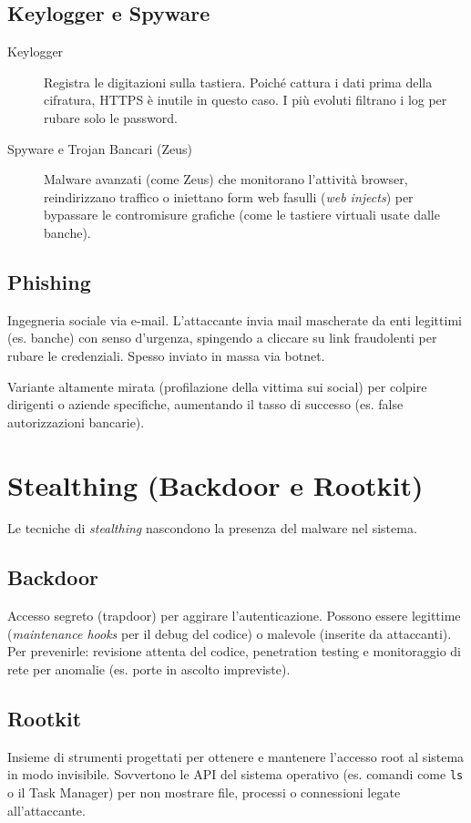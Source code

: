\subsection{Keylogger e Spyware}
\begin{description}
    \item[Keylogger] Registra le digitazioni sulla tastiera. Poiché cattura i dati prima della cifratura, HTTPS è inutile in questo caso. I più evoluti filtrano i log per rubare solo le password.
    \item[Spyware e Trojan Bancari (Zeus)] Malware avanzati (come Zeus) che monitorano l'attività browser, reindirizzano traffico o iniettano form web fasulli (\textit{web injects}) per bypassare le contromisure grafiche (come le tastiere virtuali usate dalle banche).
\end{description}

\subsection{Phishing}
Ingegneria sociale via e-mail. L'attaccante invia mail mascherate da enti legittimi (es. banche) con senso d'urgenza, spingendo a cliccare su link fraudolenti per rubare le credenziali. Spesso inviato in massa via botnet.
\begin{exbox}
Variante altamente mirata (profilazione della vittima sui social) per colpire dirigenti o aziende specifiche, aumentando il tasso di successo (es. false autorizzazioni bancarie).
\end{exbox}

\section{Stealthing (Backdoor e Rootkit)}

Le tecniche di \textit{stealthing} nascondono la presenza del malware nel sistema.

\subsection{Backdoor}
Accesso segreto (trapdoor) per aggirare l'autenticazione. Possono essere legittime (\textit{maintenance hooks} per il debug del codice) o malevole (inserite da attaccanti).
Per prevenirle: revisione attenta del codice, penetration testing e monitoraggio di rete per anomalie (es. porte in ascolto impreviste).

\subsection{Rootkit}
\begin{defbox}[Rootkit]
Insieme di strumenti progettati per ottenere e mantenere l'accesso root al sistema in modo invisibile. Sovvertono le API del sistema operativo (es. comandi come \texttt{ls} o il Task Manager) per non mostrare file, processi o connessioni legate all'attaccante.
\end{defbox}

